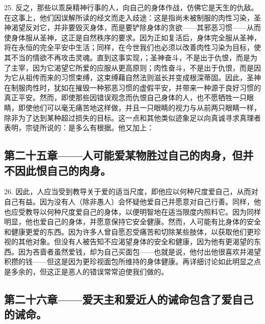 25. 反之，那些以乖戾精神行事的人，向自己的身体作战，仿佛它是天生的仇敌。在这事上，他们因误解所读的经文而走入歧途：这是指尚未被制服的肉性习染，圣神渴望反对它，并非要毁灭身体，而是要铲除身体的贪欲——其邪恶习惯——从而使身体服从圣神，这正是自然秩序的要求。因为正如复活后，身体完全服从圣神，将在永恒的完全平安中生活；同样，在今世我们也必须以改善肉性习染为目标，使其不当的情欲不再攻击灵魂。直到这事实现，；圣神奋斗，不是出于仇恨，而是为了主宰，因为它渴望它所爱的应服从更高原则；肉性奋斗，不是出于仇恨，而是因为它从祖传而来的习惯束缚，这束缚藉自然法则滋长并变成根深蒂固。因此，圣神在制服肉性时，犹如在摧毁一种邪恶习惯的虚假平安，并带来一种源于良好习惯的真正平安。然而，即使那些因错误观念而仇恨自己身体的人，也不愿牺牲一只眼睛，即使他们可以毫无痛苦地这样做，并且一只眼睛的视力与从前两只眼睛一样，除非为了达到某种超过损失的目标。这一点和其他类似迹象足以向真诚寻求真理者表明，宗徒所说的：是多么有根据。他又加上：\par


\subsection{第二十五章——人可能爱某物胜过自己的肉身，但并不因此恨自己的肉身。}

26. 因此，人应当受到教导关于爱的适当尺度，即他应以何种尺度爱自己，从而对自己有益。因为没有人（除非愚人）会怀疑他爱自己并愿意对自己行善。同样，他也应受教导以何种尺度爱自己的身体，以便明智地在适当限度内照料它。因为同样明显，他也爱自己的身体，并愿意保持它安全健康。然而，人可能有比身体的安全和健康更爱的东西。因为许多人曾自愿忍受痛苦和切除某些肢体，以获取他们更珍视的其他对象。但没有人被告知不应渴望身体的安全和健康，因为他有更渴望的东西。因为吝啬者虽然爱钱，却为自己买面包——也就是说，他付出他很喜欢并渴望积攒的钱——但这是因为更珍视面包所维持的身体健康。再详细讨论如此明显之点是多余的，但这正是恶人的错误常常迫使我们做的。\par


\subsection{第二十六章——爱天主和爱近人的诫命包含了爱自己的诫命。}

